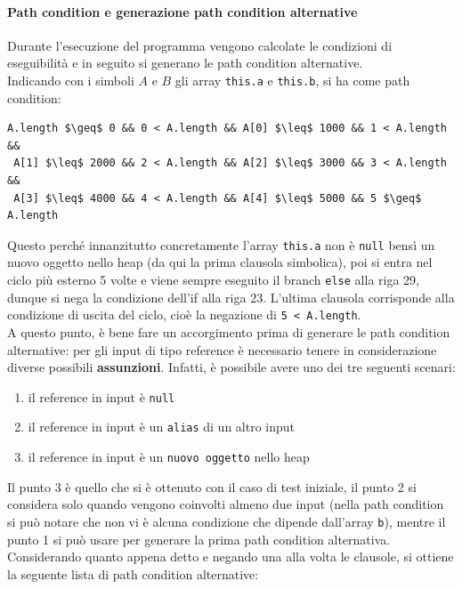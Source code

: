 \documentclass[a4paper, 12pt, oneside]{book}
\theoremstyle{normal}
\begin{document}
\paragraph{Path condition e generazione path condition alternative} Durante l'esecuzione del programma vengono calcolate le condizioni di eseguibilità e in seguito si generano le path condition alternative. 
\\ Indicando con i simboli $A$ e $B$ gli array \verb|this.a| e \verb|this.b|, si ha come path condition: \begin{lstlisting}[numbers=none, frame=none, basicstyle=\fontsize{10}{12}\selectfont\ttfamily]
A.length $\geq$ 0 && 0 < A.length && A[0] $\leq$ 1000 && 1 < A.length && 
 A[1] $\leq$ 2000 && 2 < A.length && A[2] $\leq$ 3000 && 3 < A.length && 
 A[3] $\leq$ 4000 && 4 < A.length && A[4] $\leq$ 5000 && 5 $\geq$ A.length
\end{lstlisting}
Questo perché innanzitutto concretamente l'array \verb|this.a| non è \verb|null| bensì un nuovo oggetto nello heap (da qui la prima clausola simbolica), poi si entra nel ciclo più esterno 5 volte e viene sempre eseguito il branch \verb|else| alla riga 29, dunque si nega la condizione dell'if alla riga 23. L'ultima clausola corrisponde alla condizione di uscita del ciclo, cioè la negazione di \verb|5 < A.length|.
\\ A questo punto, è bene fare un accorgimento prima di generare le path condition alternative: per gli input di tipo reference è necessario tenere in considerazione diverse possibili \textbf{assunzioni}. Infatti, è possibile avere uno dei tre seguenti scenari:
\begin{enumerate}[itemsep=0pt, topsep=2pt]
    \item il reference in input è \verb|null|
    \item il reference in input è un \verb|alias| di un altro input
    \item il reference in input è un \verb|nuovo oggetto| nello heap
\end{enumerate}
Il punto 3 è quello che si è ottenuto con il caso di test iniziale, il punto 2 si considera solo quando vengono coinvolti almeno due input (nella path condition si può notare che non vi è alcuna condizione che dipende dall'array \verb|b|), mentre il punto 1 si può usare per generare la prima path condition alternativa.
\\ Considerando quanto appena detto e negando una alla volta le clausole, si ottiene la seguente lista di path condition alternative:
\end{document}
